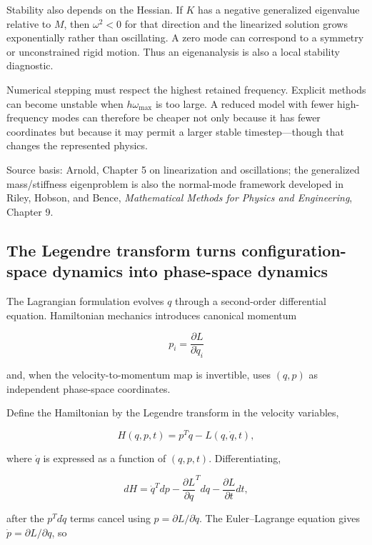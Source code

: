 Stability also depends on the Hessian. If \(K\) has a negative generalized eigenvalue relative to \(M\), then \(\omega^2<0\) for that direction and the linearized solution grows exponentially rather than oscillating. A zero mode can correspond to a symmetry or unconstrained rigid motion. Thus an eigenanalysis is also a local stability diagnostic.

Numerical stepping must respect the highest retained frequency. Explicit methods can become unstable when \(h\omega_{\max}\) is too large. A reduced model with fewer high-frequency modes can therefore be cheaper not only because it has fewer coordinates but because it may permit a larger stable timestep---though that changes the represented physics.

Source basis: Arnold, Chapter 5 on linearization and oscillations; the generalized mass/stiffness eigenproblem is also the normal-mode framework developed in Riley, Hobson, and Bence, \emph{Mathematical Methods for Physics and Engineering}, Chapter 9.

\subsection{The Legendre transform turns configuration-space dynamics into phase-space dynamics}\label{06-engine-ii-ch033-the-legendre-transform-turns-configuration-space-dynamics-into-phase-space-dynamics}

\hypertarget{06-engine-ii-ch033-the-legendre-transform-turns-configuration-space-dynamics-into-phase-space-dynamics}{}

The Lagrangian formulation evolves \(q\) through a second-order differential equation. Hamiltonian mechanics introduces canonical momentum

\[
p_i
=
\frac{\partial L}{\partial\dot q_i}
\]

and, when the velocity-to-momentum map is invertible, uses \((q,p)\) as independent phase-space coordinates.

Define the Hamiltonian by the Legendre transform in the velocity variables,

\[
H(q,p,t)
=
p^T\dot q-L(q,\dot q,t),
\]

where \(\dot q\) is expressed as a function of \((q,p,t)\). Differentiating,

\[
dH
=
\dot q^Tdp
-
\frac{\partial L}{\partial q}^Tdq
-
\frac{\partial L}{\partial t}dt,
\]

after the \(p^Td\dot q\) terms cancel using \(p=\partial L/\partial\dot q\). The Euler--Lagrange equation gives \(\dot p=\partial L/\partial q\), so

